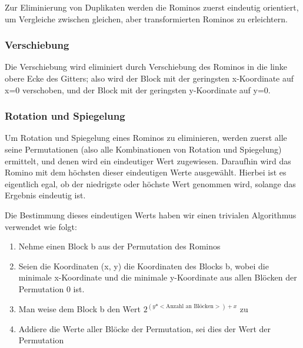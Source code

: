 \documentclass[a4paper,10pt,ngerman]{scrartcl}
\begin{document}
Zur Eliminierung von Duplikaten werden die Rominos zuerst eindeutig orientiert, um Vergleiche zwischen gleichen, aber transformierten Rominos zu erleichtern.

\subsubsection{Verschiebung}

Die Verschiebung wird eliminiert durch Verschiebung des Rominos in die linke obere Ecke des Gitters; also wird der Block mit der geringsten x-Koordinate auf x=0 verschoben, und der Block mit der geringsten y-Koordinate auf y=0.

\subsubsection{Rotation und Spiegelung} \label{uniqueCode}

Um Rotation und Spiegelung eines Rominos zu eliminieren,
werden zuerst alle seine Permutationen
(also alle Kombinationen von Rotation und Spiegelung)
ermittelt, und denen wird ein eindeutiger Wert zugewiesen.
Daraufhin wird das Romino mit dem höchsten dieser eindeutigen Werte ausgewählt.
Hierbei ist es eigentlich egal, ob der niedrigste oder höchste Wert genommen
wird, solange das Ergebnis eindeutig ist.

Die Bestimmung dieses eindeutigen Werts haben wir einen trivialen Algorithmus
verwendet wie folgt:

\begin{enumerate}
\item Nehme einen Block b aus der Permutation des Rominos
\item Seien die Koordinaten (x, y) die Koordinaten des Blocks b, wobei die minimale x-Koordinate und die minimale y-Koordinate aus allen Blöcken der Permutation 0 ist.
\item Man weise dem Block b den Wert \(2^{(y * <\text{Anzahl an Blöcken}>) + x}\) zu
\item Addiere die Werte aller Blöcke der Permutation, sei dies der Wert der Permutation
\end{enumerate}

\end{document}
